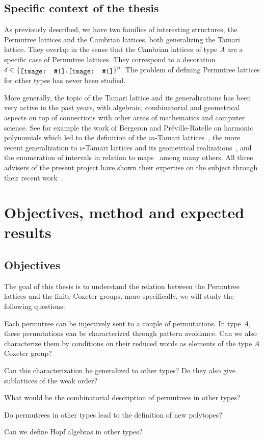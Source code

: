 \documentclass[a4paper,12pt]{article}
\newcommand{\includeSymbol}[1]{\ensuremath{%
	\mathchoice
		{\raisebox{-.7mm}{\texttt{[image: \#1]}}}	
		{\raisebox{-.7mm}{\texttt{[image: \#1]}}}
		{\raisebox{-.6mm}{\texttt{[image: \#1]}}}
		{\raisebox{-.5mm}{\texttt{[image: \#1]}}}
}}
\newcommand{\upCirc}{\includeSymbol{up}}
\newcommand{\downCirc}{\includeSymbol{down}}
\begin{document}
\subsection{Specific context of the thesis}

As previously described, we have two families of interesting structures, the Permutree lattices and the Cambrian lattices, both generalizing the Tamari lattice. They overlap in the sense that the Cambrian lattices of type $A$ are a specific case of Permutree lattices. They correspond to a decoration $\delta \in \lbrace \upCirc, \downCirc \rbrace^n$. The problem of defining Permutree lattices for other types has never been studied.

More generally, the topic of the Tamari lattice and its generalizations has been very active in the past years, with algebraic, combinatorial and geometrical aspects on top of connections with other areas of mathematics and computer science. See for example the work of Bergeron and Préville-Ratelle on harmonic polynomials which led to the definition of the $m$-Tamari lattices~\cite{BergmTamari}, the more recent generalization to $\nu$-Tamari lattices and its geometrical realizations~\cite{RatelleViennot, mTamGeom}, and the enumeration of intervals in relation to maps~\cite{BijTriangulations, FangPrevilleRatelle} among many others. All three advisers of the present project have shown their expertise on the subject through their recent work~\cite{HivertNovelliThibon-algebraBinarySearchTrees, LangePilaud, ChatelPilaud, ChatelPons, PilaudPons-permutrees, ChatelPilaudPons, CeballosPonsFPSAC}. 

\section{Objectives, method and expected results}

\subsection{Objectives}

The goal of this thesis is to understand the relation between the Permutree lattices and the finite Coxeter groups, more specifically, we will study the following questions:

\begin{compactitem}
\item Each permutree can be injectively sent to a couple of permutations. In type $A$, these permutations can be characterized through pattern avoidance. Can we also characterize them by conditions on their reduced words as elements of the type $A$ Coxeter group? 
\item Can this characterization be generalized to other types? Do they also give sublattices of the weak order?
\item What would be the combinatorial description of permutrees in other types?
\item Do permutrees in other types lead to the definition of new polytopes?
\item Can we define Hopf algebras in other types?
\end{compactitem}
\end{document}
